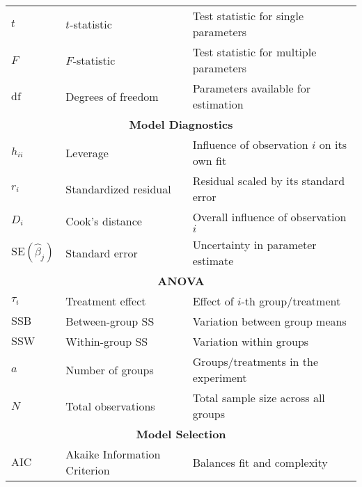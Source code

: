 \documentclass[10pt]{article}
\begin{document}
\begin{center}
\begin{tabular}{l l l}
    $t$                        & $t$-statistic                  & Test statistic for single parameters                    \\
    $F$                        & $F$-statistic                  & Test statistic for multiple parameters                  \\
    $\text{df}$                & Degrees of freedom             & Parameters available for estimation                     \\
    \midrule
    \multicolumn{3}{c}{\textbf{Model Diagnostics}}                                                                        \\
    $h_{ii}$                   & Leverage                       & Influence of observation $i$ on its own fit             \\
    $r_i$                      & Standardized residual          & Residual scaled by its standard error                   \\
    $D_i$                      & Cook's distance                & Overall influence of observation $i$                    \\
    $\text{SE}(\hat{\beta}_j)$ & Standard error                 & Uncertainty in parameter estimate                       \\
    \midrule
    \multicolumn{3}{c}{\textbf{ANOVA}}                                                                                    \\
    $\tau_i$                   & Treatment effect               & Effect of $i$-th group/treatment                        \\
    $\text{SSB}$               & Between-group SS               & Variation between group means                           \\
    $\text{SSW}$               & Within-group SS                & Variation within groups                                 \\
    $a$                        & Number of groups               & Groups/treatments in the experiment                     \\
    $N$                        & Total observations             & Total sample size across all groups                     \\
    \midrule
    \multicolumn{3}{c}{\textbf{Model Selection}}                                                                          \\
    $\text{AIC}$               & Akaike Information Criterion   & Balances fit and complexity                             \\

\end{tabular}
\end{center}
\end{document}
